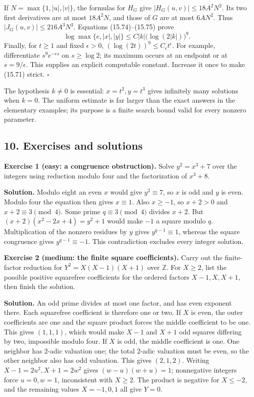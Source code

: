 \documentclass[
  11pt,
  a4paper,
]{article}
\begin{document}
If \(N=\max\{1,|u|,|v|\}\), the formulas for \(H_G\) give
\(|H_G(u,v)|\le18A^2N^2\). Its two first derivatives are at most
\(18A^2N\), and those of \(G\) are at most \(6AN^2\). Thus
\(|J_G(u,v)|\le216A^3N^3\). Equations (15.74)--(15.75) prove \[
\log\max\{e,|x|,|y|\}
 \le C |k|\bigl(\log(2|k|)\bigr)^9.
\] Finally, for \(t\ge1\) and fixed \(\epsilon>0\),
\((\log(2t))^9\le C_\epsilon t^\epsilon\). For example, differentiate
\(s^9e^{-\epsilon s}\) on \(s\ge\log2\); its maximum occurs at an
endpoint or at \(s=9/\epsilon\). This supplies an explicit computable
constant. Increase it once to make (15.71) strict. \(\square\)

The hypothesis \(k\ne0\) is essential: \(x=t^2,y=t^3\) gives infinitely
many solutions when \(k=0\). The uniform estimate is far larger than the
exact answers in the elementary examples; its purpose is a finite search
bound valid for every nonzero parameter.

\subsection{10. Exercises and solutions}\label{exercises-and-solutions}

\textbf{Exercise 1 (easy: a congruence obstruction).} Solve
\(y^2=x^3+7\) over the integers using reduction modulo four and the
factorization of \(x^3+8\).

\textbf{Solution.} Modulo eight an even \(x\) would give \(y^2\equiv7\),
so \(x\) is odd and \(y\) is even. Modulo four the equation then gives
\(x\equiv1\). Also \(x\ge-1\), so \(x+2>0\) and \(x+2\equiv3\pmod4\).
Some prime \(q\equiv3\pmod4\) divides \(x+2\). But
\((x+2)(x^2-2x+4)=y^2+1\) would make \(-1\) a square modulo \(q\).
Multiplication of the nonzero residues by \(y\) gives
\(y^{q-1}\equiv1\), whereas the square congruence gives
\(y^{q-1}\equiv-1\). This contradiction excludes every integer solution.

\textbf{Exercise 2 (medium: the finite square coefficients).} Carry out
the finite-factor reduction for \(Y^2=X(X-1)(X+1)\) over \(\mathbb Z\).
For \(X\ge2\), list the possible positive squarefree coefficients for
the ordered factors \(X-1,X,X+1\), then finish the solution.

\textbf{Solution.} An odd prime divides at most one factor, and has even
exponent there. Each squarefree coefficient is therefore one or two. If
\(X\) is even, the outer coefficients are one and the square product
forces the middle coefficient to be one. This gives \((1,1,1)\), which
would make \(X-1\) and \(X+1\) odd squares differing by two, impossible
modulo four. If \(X\) is odd, the middle coefficient is one. One
neighbor has 2-adic valuation one; the total 2-adic valuation must be
even, so the other neighbor also has odd valuation. This gives
\((2,1,2)\). Writing \(X-1=2u^2,X+1=2w^2\) gives \((w-u)(w+u)=1\);
nonnegative integers force \(u=0,w=1\), inconsistent with \(X\ge2\). The
product is negative for \(X\le-2\), and the remaining values
\(X=-1,0,1\) all give \(Y=0\).
\end{document}
